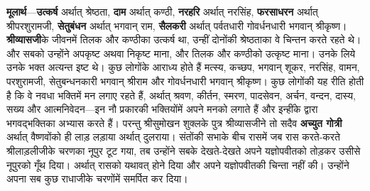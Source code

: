 \begin{sloppypar}\justifying{}
\textbf{मूलार्थ}—\textbf{उत्कर्ष} अर्थात् श्रेष्ठता, \textbf{दाम} अर्थात् कण्ठी, \textbf{नरहरि} अर्थात् नरसिंह, \textbf{फरसाधरन} अर्थात् श्रीपरशुरामजी, \textbf{सेतुबंधन} अर्थात् भगवान् राम, \textbf{सैलकरी} अर्थात् पर्वतधारी गोवर्धनधारी भगवान् श्रीकृष्ण। \textbf{श्रीव्यासजी}के जीवनमें तिलक और कण्ठीका उत्कर्ष था, उन्हीं दोनोंकी श्रेष्ठताका वे चिन्तन करते रहते थे। और सबको उन्होंने अपकृष्ट अथवा निकृष्ट माना, और तिलक और कण्ठीको उत्कृष्ट माना। उनके लिये उनके भक्त अत्यन्त इष्ट थे। कुछ लोगोंके आराध्य होते हैं मत्स्य, कच्छप, भगवान् शूकर, नरसिंह, वामन, परशुरामजी, सेतुबन्धन\-कारी भगवान् श्रीराम और गोवर्धन\-धारी भगवान् श्रीकृष्ण। कुछ लोगोंकी यह रीति होती है कि वे नवधा भक्तिमें मन लगाए रहते हैं, अर्थात् श्रवण, कीर्तन, स्मरण, पादसेवन, अर्चन, वन्दन, दास्य, सख्य और आत्मनिवेदन—इन नौ प्रकारकी भक्तियोंमें अपने मनको लगाते हैं और इन्हींके द्वारा भगवद्भक्तिका अभ्यास करते हैं। परन्तु श्रीसुमोखन शुक्लके पुत्र श्रीव्यासजीने तो सदैव \textbf{अच्युत गोत्री} अर्थात् वैष्णवोंको ही लाड़ लड़ाया अर्थात् दुलराया। संतोंकी सभाके बीच रासमें जब रास करते-करते श्रीलाड़लीजीके चरणका नूपुर टूट गया, तब उन्होंने सबके देखते-देखते अपने यज्ञोपवीतको तोड़कर उसीसे नूपुरको गूँथ दिया। अर्थात् रासको यथावत् होने दिया और अपने यज्ञोपवीतकी चिन्ता नहीं की। उन्होंने अपना सब कुछ राधाजीके चरणोंमें समर्पित कर दिया।
\end{sloppypar}


